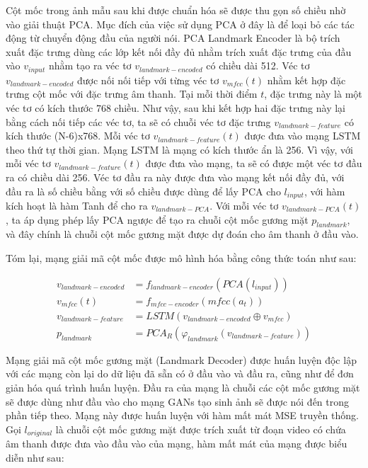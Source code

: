 Cột mốc trong ảnh mẫu sau khi được chuẩn hóa sẽ được thu gọn số chiều nhờ vào giải thuật PCA. Mục đích của việc sử dụng PCA ở đây là để loại bỏ các tác động từ chuyển động đầu của người nói. PCA Landmark Encoder là bộ trích xuất đặc trưng dùng các lớp kết nối đầy đủ nhằm trích xuất đặc trưng của đầu vào $v_{input}$ nhằm tạo ra véc tơ $v_{landmark-encoded}$ có chiều dài 512. Véc tơ $v_{landmark-encoded}$ được nối nối tiếp với từng véc tơ $v_{mfcc}(t)$ nhằm kết hợp đặc trưng cột mốc với đặc trưng âm thanh. Tại mỗi thời điểm $t$, đặc trưng này là một véc tơ có kích thước 768 chiều. Như vậy, sau khi kết hợp hai đặc trưng này lại bằng cách nối tiếp các véc tơ, ta sẽ có chuỗi véc tơ đặc trưng $v_{landmark-feature}$ có kích thước (N-6)x768. Mỗi véc tơ $v_{landmark-feature}(t)$ được đưa vào mạng LSTM theo thứ tự thời gian. Mạng LSTM là mạng có kích thước ẩn là 256. Vì vậy, với mỗi véc tơ $v_{landmark-feature}(t)$ được đưa vào mạng, ta sẽ có được một véc tơ đầu ra có chiều dài 256. Véc tơ đầu ra này được đưa vào mạng kết nối đầy đủ, với đầu ra là số chiều bằng với số chiều được dùng để lấy PCA cho $l_{input}$, với hàm kích hoạt là hàm Tanh để cho ra $v_{landmark-PCA}$. Với mỗi véc tơ $v_{landmark-PCA}(t)$, ta áp dụng phép lấy PCA ngược để tạo ra chuỗi cột mốc gương mặt $p_{landmark}$, và đây chính là chuỗi cột mốc gương mặt được dự đoán cho âm thanh ở đầu vào.

Tóm lại, mạng giải mã cột mốc được mô hình hóa bằng công thức toán như sau:

\begin{equation}
    \begin{split}
    v_{landmark-encoded} &= f_{landmark-encoder}(PCA(l_{input}))\\
    v_{mfcc}(t) &= f_{mfcc-encoder}(mfcc(a_t))\\
    v_{landmark-feature} &= LSTM(v_{landmark-encoded} \oplus v_{mfcc})\\
    p_{landmark} &= PCA_R(\varphi_{landmark}(v_{landmark-feature}))
    \end{split}
\end{equation}

Mạng giải mã cột mốc gương mặt (Landmark Decoder) được huấn luyện độc lập với các mạng còn lại do dữ liệu đã sẵn có ở đầu vào và đầu ra, cũng như để đơn giản hóa quá trình huấn luyện. Đầu ra của mạng là chuỗi các cột mốc gương mặt sẽ được dùng như đầu vào cho mạng GANs tạo sinh ảnh sẽ được nói đến trong phần tiếp theo. Mạng này được huấn luyện với hàm mất mát MSE truyền thống. Gọi $l_{original}$ là chuỗi cột mốc gương mặt được trích xuất từ đoạn video có chứa âm thanh được đưa vào đầu vào của mạng, hàm mất mát của mạng được biểu diễn như sau:

